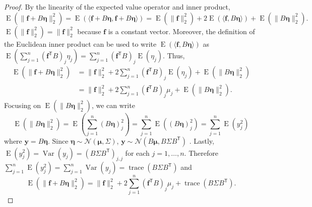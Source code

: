 \documentclass[12pt]{article}
\newcommand{\fVec}{\mathbf{f}}	%
\newcommand{\trans}[1]{{#1}^\mathsf{T}}	%
\DeclareMathOperator{\trace}{trace}		%
\newcommand{\noise}{\eta}	%
\newcommand{\noiseVec}{\bm{\noise}}	%
\DeclareMathOperator{\Var}{Var}	%
\DeclareMathOperator{\E}{E}	%
\begin{document}
\begin{proof}
By the linearity of the expected value operator and inner product,
\[\E(\|\fVec + B\noiseVec\|_2^2) = \E(\langle \fVec + B\noiseVec, \fVec + B\noiseVec\rangle) =  \E(\|\fVec\|_2^2) + 2\E(\langle \fVec, B\noiseVec\rangle) + \E(\|B\noiseVec\|_2^2).\]
$\E(\|\fVec\|_2^2) = \|\fVec\|_2^2$ because $\fVec$ is a constant vector. Moreover, the definition of the Euclidean inner product can be used to write $\E(\langle \fVec, B\noiseVec\rangle)$ as $\E(\sum_{j=1}^n (\trans{\fVec}B)_j \noise_j) = \sum_{j=1}^n (\trans{\fVec}B)_j \E(\noise_j)$. Thus,
\begin{align*}
\E(\|\fVec + B\noiseVec\|_2^2) &= \|\fVec\|_2^2 + 2\sum_{j=1}^{n} (\trans{\fVec}B)_j \E(\noise_j) + \E(\|B\noiseVec\|_2^2) \\
&= \|\fVec\|_2^2 + 2\sum_{j=1}^{n} (\trans{\fVec}B)_j \mu_j + \E(\|B\noiseVec\|_2^2).
\end{align*}
Focusing on $\E(\|B\noiseVec\|_2^2)$, we can write
\[\E(\|B\noiseVec\|_2^2) = \E\left(\sum_{j=1}^n (B\noiseVec)_j^2\right) = \sum_{j=1}^n \E((B\noiseVec)_j^2) = \sum_{j=1}^n \E(y_j^2)\]
where $\mathbf{y} = B\noiseVec$.
Since $\noiseVec \sim \mathcal{N}(\bm{\mu},\Sigma)$, $\mathbf{y} \sim \mathcal{N}(B\bm{\mu},B\Sigma\trans{B})$ \cite{Rao1973}. Lastly, $\E(y_j^2) = \Var(y_j) = (B\Sigma\trans{B})_{j,j}$ for each $j = 1,\ldots,n$. Therefore $\sum_{j=1}^n \E(y_j^2) = \sum_{j=1}^n \Var(y_j) = \trace(B\Sigma\trans{B})$ and
\[\E(\|\fVec + B\noiseVec\|_2^2) = \|\fVec\|_2^2 + 2\sum_{j=1}^{n} (\trans{\fVec}B)_j \mu_j + \trace(B\Sigma\trans{B}).\]
\end{proof}
\end{document}
